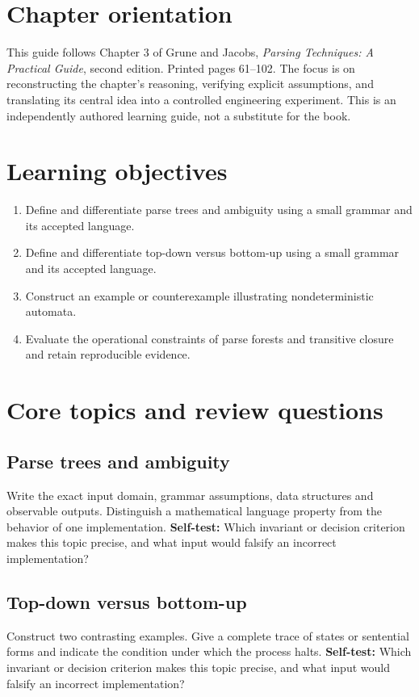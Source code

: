 \documentclass[11pt,letterpaper]{article}
\begin{document}
\makedoctitle\makedocsummary
\tableofcontents\clearpage
\section{Chapter orientation}
This guide follows Chapter 3 of Grune and Jacobs, \emph{Parsing Techniques: A Practical Guide}, second edition. Printed pages 61--102. The focus is on reconstructing the chapter's reasoning, verifying explicit assumptions, and translating its central idea into a controlled engineering experiment. This is an independently authored learning guide, not a substitute for the book.
\section{Learning objectives}
\begin{enumerate}
\item Define and differentiate parse trees and ambiguity using a small grammar and its accepted language.
\item Define and differentiate top-down versus bottom-up using a small grammar and its accepted language.
\item Construct an example or counterexample illustrating nondeterministic automata.
\item Evaluate the operational constraints of parse forests and transitive closure and retain reproducible evidence.
\end{enumerate}
\section{Core topics and review questions}
\subsection{Parse trees and ambiguity}
Write the exact input domain, grammar assumptions, data structures and observable outputs. Distinguish a mathematical language property from the behavior of one implementation.
\textbf{Self-test:} Which invariant or decision criterion makes this topic precise, and what input would falsify an incorrect implementation?
\subsection{Top-down versus bottom-up}
Construct two contrasting examples. Give a complete trace of states or sentential forms and indicate the condition under which the process halts.
\textbf{Self-test:} Which invariant or decision criterion makes this topic precise, and what input would falsify an incorrect implementation?
\end{document}
